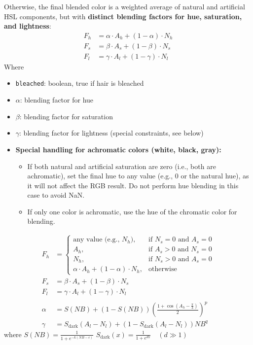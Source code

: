 \documentclass[12pt]{article}
\begin{document}
Otherwise, the final blended color is a weighted average of natural and artificial HSL components, but with \textbf{distinct blending factors for hue, saturation, and lightness}:
\begin{align*}
F_h &= \alpha \cdot A_h + (1 - \alpha) \cdot N_h \\
F_s &= \beta \cdot A_s + (1 - \beta) \cdot N_s \\
F_l &= \gamma \cdot A_l + (1 - \gamma) \cdot N_l
\end{align*}
Where
\begin{itemize}
    \item \texttt{bleached}: boolean, true if hair is bleached
    \item $\alpha$: blending factor for hue
    \item $\beta$: blending factor for saturation
    \item $\gamma$: blending factor for lightness (special constraints, see below)
\end{itemize}

\begin{itemize}
    \item \textbf{Special handling for achromatic colors (white, black, gray):}
    \begin{itemize}
        \item If both natural and artificial saturation are zero (i.e., both are achromatic), set the final hue to any value (e.g., 0 or the natural hue), as it will not affect the RGB result. Do not perform hue blending in this case to avoid NaN.
        \item If only one color is achromatic, use the hue of the chromatic color for blending.
    \end{itemize}
\end{itemize}

\begin{align*}
F_h &= \begin{cases}
  \text{any value (e.g., } N_h \text{)}, & \text{if } N_s = 0 \text{ and } A_s = 0 \\
  A_h, & \text{if } A_s > 0 \text{ and } N_s = 0 \\
  N_h, & \text{if } N_s > 0 \text{ and } A_s = 0 \\
  \alpha \cdot A_h + (1 - \alpha) \cdot N_h, & \text{otherwise}
\end{cases} \\
F_s &= \beta \cdot A_s + (1 - \beta) \cdot N_s \\
F_l &= \gamma \cdot A_l + (1 - \gamma) \cdot N_l \\
\\
\alpha &= S(NB) + (1 - S(NB)) \left( \frac{1 + \cos(A_h - \frac{\pi}{3})}{2} \right)^p \\
\gamma &= S_{\text{dark}}(A_l - N_l) + (1 - S_{\text{dark}}(A_l - N_l)) NB^q
\end{align*}
where
\(
S(NB) = \frac{1}{1 + e^{-k(NB - c)}}
\)
\(
S_{\text{dark}}(x) = \frac{1}{1 + e^{d x}} \quad (d \gg 1)
\)
\end{document}
